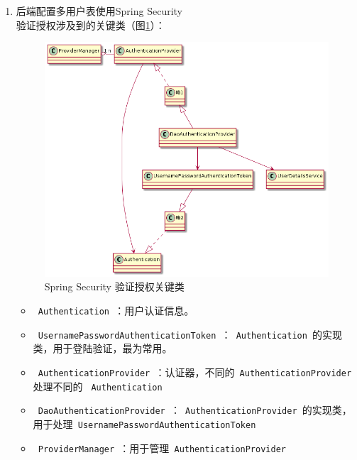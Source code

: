 \begin{enumerate}
  \item 后端配置多用户表使用Spring Security\\
        验证授权涉及到的关键类（图\ref{SpringSecurity}）：
        \begin{figure}[H]
          \centering
          \includegraphics[scale = 0.5]{out/uml/类图/Spring Security/SpringSecurity验证/SpringSecurity验证.png}
          \caption{\song\wuhao Spring Security 验证授权关键类}
          \label{SpringSecurity}
        \end{figure}
        \begin{itemize}
          \item \lstinline[language = Java]| Authentication |：用户认证信息。
          \item \lstinline[language = Java]| UsernamePasswordAuthenticationToken |：\lstinline[language = Java]| Authentication |的实现类，用于登陆验证，最为常用。
          \item \lstinline[language = Java]| AuthenticationProvider |：认证器，不同的\lstinline[language = Java]| AuthenticationProvider | 处理不同的 \lstinline[language = Java]| Authentication |
          \item \lstinline[language = Java]| DaoAuthenticationProvider |：\lstinline[language = Java]| AuthenticationProvider |的实现类，用于处理\lstinline[language = Java]| UsernamePasswordAuthenticationToken |
          \item \lstinline[language = Java]| ProviderManager |：用于管理\lstinline[language = Java]| AuthenticationProvider |

\end{itemize}
\end{enumerate}
